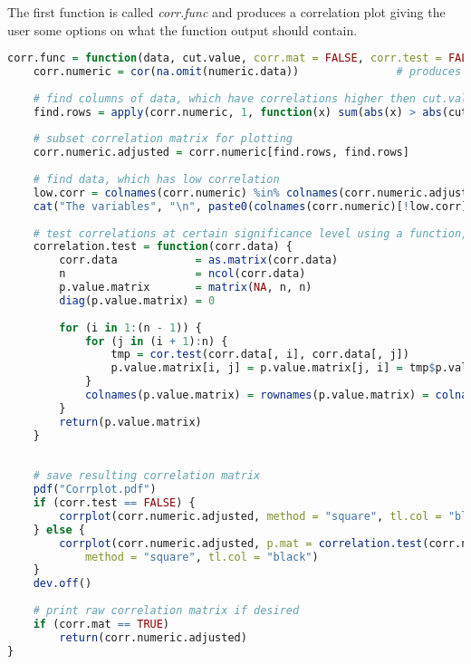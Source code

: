 The first function is called \textit{corr.func} and produces a correlation  plot giving the user some options on what the function output should contain.
\begin{lstlisting}[language=R]
corr.func = function(data, cut.value, corr.mat = FALSE, corr.test = FALSE, significance = 0.05) {
    corr.numeric = cor(na.omit(numeric.data))               # produces correlation matrix of all numeric variables in the dataset
    
    # find columns of data, which have correlations higher then cut.value
    find.rows = apply(corr.numeric, 1, function(x) sum(abs(x) > abs(cut.value)) > 1)
    
    # subset correlation matrix for plotting
    corr.numeric.adjusted = corr.numeric[find.rows, find.rows]
    
    # find data, which has low correlation
    low.corr = colnames(corr.numeric) %in% colnames(corr.numeric.adjusted)
    cat("The variables", "\n", paste0(colnames(corr.numeric)[!low.corr], collapse = ", "), "\n", "have very low bivariate correlations with the other numeric variables in the training data set!")
    
    # test correlations at certain significance level using a function, that produces a p-value matrix for all bivariate correlations
    correlation.test = function(corr.data) {
        corr.data            = as.matrix(corr.data)
        n                    = ncol(corr.data)
        p.value.matrix       = matrix(NA, n, n)
        diag(p.value.matrix) = 0
        
        for (i in 1:(n - 1)) {
            for (j in (i + 1):n) {
                tmp = cor.test(corr.data[, i], corr.data[, j])            # testing correlation
                p.value.matrix[i, j] = p.value.matrix[j, i] = tmp$p.value # filling p-value matrix with respective p-values
            }
            colnames(p.value.matrix) = rownames(p.value.matrix) = colnames(corr.numeric.adjusted)
        }
        return(p.value.matrix)
    }
    
    
    # save resulting correlation matrix
    pdf("Corrplot.pdf")
    if (corr.test == FALSE) {
        corrplot(corr.numeric.adjusted, method = "square", tl.col = "black")
    } else {
        corrplot(corr.numeric.adjusted, p.mat = correlation.test(corr.numeric.adjusted), sig.level = significance, 
            method = "square", tl.col = "black")
    }
    dev.off()
    
    # print raw correlation matrix if desired
    if (corr.mat == TRUE) 
        return(corr.numeric.adjusted)
}
\end{lstlisting}
